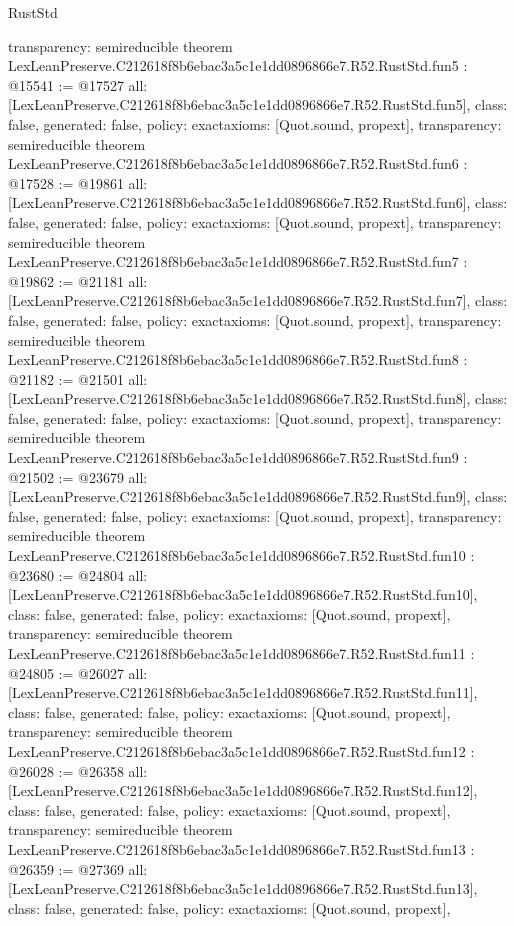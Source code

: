 \begin{lexlean}{RustStd}
\begin{coremodule}
{  transparency: semireducible
}
theorem LexLeanPreserve.C212618f8b6ebac3a5c1e1dd0896866e7.R52.RustStd.fun5 : @15541 := @17527 {
  all: [LexLeanPreserve.C212618f8b6ebac3a5c1e1dd0896866e7.R52.RustStd.fun5],
  class: false,
  generated: false,
  policy: exact{axioms: [Quot.sound, propext]},
  transparency: semireducible
}
theorem LexLeanPreserve.C212618f8b6ebac3a5c1e1dd0896866e7.R52.RustStd.fun6 : @17528 := @19861 {
  all: [LexLeanPreserve.C212618f8b6ebac3a5c1e1dd0896866e7.R52.RustStd.fun6],
  class: false,
  generated: false,
  policy: exact{axioms: [Quot.sound, propext]},
  transparency: semireducible
}
theorem LexLeanPreserve.C212618f8b6ebac3a5c1e1dd0896866e7.R52.RustStd.fun7 : @19862 := @21181 {
  all: [LexLeanPreserve.C212618f8b6ebac3a5c1e1dd0896866e7.R52.RustStd.fun7],
  class: false,
  generated: false,
  policy: exact{axioms: [Quot.sound, propext]},
  transparency: semireducible
}
theorem LexLeanPreserve.C212618f8b6ebac3a5c1e1dd0896866e7.R52.RustStd.fun8 : @21182 := @21501 {
  all: [LexLeanPreserve.C212618f8b6ebac3a5c1e1dd0896866e7.R52.RustStd.fun8],
  class: false,
  generated: false,
  policy: exact{axioms: [Quot.sound, propext]},
  transparency: semireducible
}
theorem LexLeanPreserve.C212618f8b6ebac3a5c1e1dd0896866e7.R52.RustStd.fun9 : @21502 := @23679 {
  all: [LexLeanPreserve.C212618f8b6ebac3a5c1e1dd0896866e7.R52.RustStd.fun9],
  class: false,
  generated: false,
  policy: exact{axioms: [Quot.sound, propext]},
  transparency: semireducible
}
theorem LexLeanPreserve.C212618f8b6ebac3a5c1e1dd0896866e7.R52.RustStd.fun10 : @23680 := @24804 {
  all: [LexLeanPreserve.C212618f8b6ebac3a5c1e1dd0896866e7.R52.RustStd.fun10],
  class: false,
  generated: false,
  policy: exact{axioms: [Quot.sound, propext]},
  transparency: semireducible
}
theorem LexLeanPreserve.C212618f8b6ebac3a5c1e1dd0896866e7.R52.RustStd.fun11 : @24805 := @26027 {
  all: [LexLeanPreserve.C212618f8b6ebac3a5c1e1dd0896866e7.R52.RustStd.fun11],
  class: false,
  generated: false,
  policy: exact{axioms: [Quot.sound, propext]},
  transparency: semireducible
}
theorem LexLeanPreserve.C212618f8b6ebac3a5c1e1dd0896866e7.R52.RustStd.fun12 : @26028 := @26358 {
  all: [LexLeanPreserve.C212618f8b6ebac3a5c1e1dd0896866e7.R52.RustStd.fun12],
  class: false,
  generated: false,
  policy: exact{axioms: [Quot.sound, propext]},
  transparency: semireducible
}
theorem LexLeanPreserve.C212618f8b6ebac3a5c1e1dd0896866e7.R52.RustStd.fun13 : @26359 := @27369 {
  all: [LexLeanPreserve.C212618f8b6ebac3a5c1e1dd0896866e7.R52.RustStd.fun13],
  class: false,
  generated: false,
  policy: exact{axioms: [Quot.sound, propext]},
}
\end{coremodule}
\end{lexlean}
